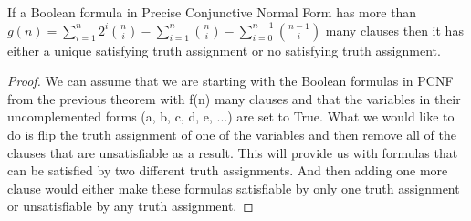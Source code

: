 \documentclass[runningheads,a4paper]{llncs}
\begin{document}
\begin{theorem}\normalfont

If a Boolean formula in Precise Conjunctive Normal Form has more than $g(n) = \sum_{i=1}^{n} 2^{i} \binom{n} {i} - \sum_{i=1}^{n} \binom{n} {i} - \sum_{i=0}^{n-1} \binom{n-1} {i} $ many clauses then it has either a unique satisfying truth assignment or no satisfying truth assignment.
\begin{proof}

We can assume that we are starting with the Boolean formulas in PCNF from the previous theorem with f(n) many clauses and that the variables in their uncomplemented forms (a, b, c, d, e, ...) are set to True. What we would like to do is flip the truth assignment of one of the variables and then remove all of the clauses that are unsatisfiable as a result. This will provide us with formulas that can be satisfied by two different truth assignments. And then adding one more clause would either make these formulas satisfiable by only one truth assignment or unsatisfiable by any truth assignment. 


\end{proof}
\end{theorem}
\end{document}
